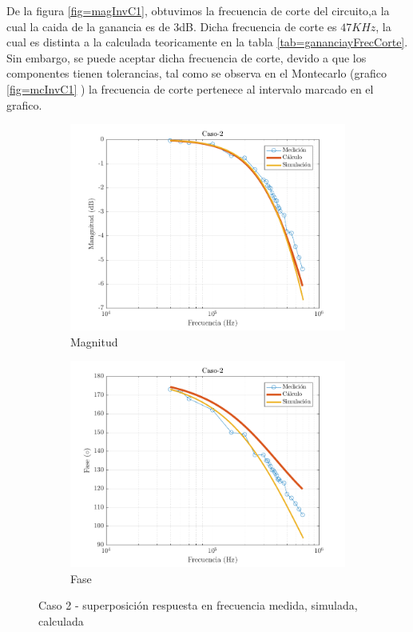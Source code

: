 \documentclass[../../main.tex]{subfiles}
\begin{document}
De la figura \ref{fig=magInvC1}, obtuvimos la frecuencia de corte del circuito,a la cual la caida de la ganancia es de 3dB. Dicha frecuencia de corte es $47KHz$, la cual es distinta a la calculada teoricamente en la tabla \ref{tab=gananciayFrecCorte}. Sin embargo, se puede aceptar dicha frecuencia de corte, devido a que los componentes tienen tolerancias, tal como se observa en el Montecarlo (grafico  \ref{fig=mcInvC1} ) la frecuencia de corte pertenece al intervalo marcado en el grafico.



\begin{figure}[H]
\centering
\begin{subfigure}[http]{0.49\textwidth}
\includegraphics[width=\textwidth]{imagenes/Caso-2_mag_inv.png}
\caption{Magnitud}\label{fig=magInvC2}
\end{subfigure}
\begin{subfigure}[http]{0.49\textwidth}
\includegraphics[width=\textwidth]{imagenes/Caso-2_fase_inv.png}
\caption{Fase}
\end{subfigure}
\caption{Caso 2 - superposición respuesta en  frecuencia medida, simulada, calculada}
\end{figure}
\end{document}
